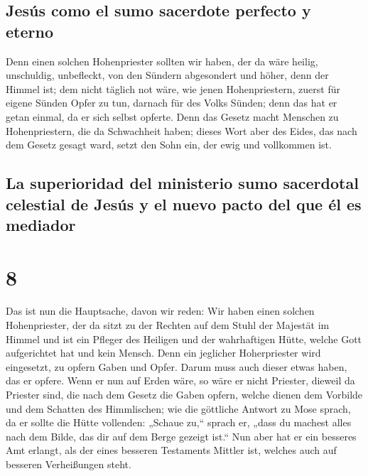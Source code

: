 \hypertarget{jesuxfas-como-el-sumo-sacerdote-perfecto-y-eterno}{%
\subsection{Jesús como el sumo sacerdote perfecto y
eterno}\label{jesuxfas-como-el-sumo-sacerdote-perfecto-y-eterno}}

 Denn einen solchen Hohenpriester sollten wir haben, der
da wäre heilig, unschuldig, unbefleckt, von den Sündern abgesondert und
höher, denn der Himmel ist;  dem nicht täglich not wäre,
wie jenen Hohenpriestern, zuerst für eigene Sünden Opfer zu tun, darnach
für des Volks Sünden; denn das hat er getan einmal, da er sich selbst
opferte.  Denn das Gesetz macht Menschen zu
Hohenpriestern, die da Schwachheit haben; dieses Wort aber des Eides,
das nach dem Gesetz gesagt ward, setzt den Sohn ein, der ewig und
vollkommen ist.

\hypertarget{la-superioridad-del-ministerio-sumo-sacerdotal-celestial-de-jesuxfas-y-el-nuevo-pacto-del-que-uxe9l-es-mediador}{%
\subsection{La superioridad del ministerio sumo sacerdotal celestial de
Jesús y el nuevo pacto del que él es
mediador}\label{la-superioridad-del-ministerio-sumo-sacerdotal-celestial-de-jesuxfas-y-el-nuevo-pacto-del-que-uxe9l-es-mediador}}

\hypertarget{section-7}{%
\section{8}\label{section-7}}

 Das ist nun die Hauptsache, davon wir reden: Wir haben
einen solchen Hohenpriester, der da sitzt zu der Rechten auf dem Stuhl
der Majestät im Himmel  und ist ein Pfleger des Heiligen
und der wahrhaftigen Hütte, welche Gott aufgerichtet hat und kein
Mensch.  Denn ein jeglicher Hoherpriester wird eingesetzt,
zu opfern Gaben und Opfer. Darum muss auch dieser etwas haben, das er
opfere.  Wenn er nun auf Erden wäre, so wäre er nicht
Priester, dieweil da Priester sind, die nach dem Gesetz die Gaben
opfern,  welche dienen dem Vorbilde und dem Schatten des
Himmlischen; wie die göttliche Antwort zu Mose sprach, da er sollte die
Hütte vollenden: „Schaue zu,`` sprach er, „dass du machest alles nach
dem Bilde, das dir auf dem Berge gezeigt ist.``  Nun aber
hat er ein besseres Amt erlangt, als der eines besseren Testaments
Mittler ist, welches auch auf besseren Verheißungen steht.

